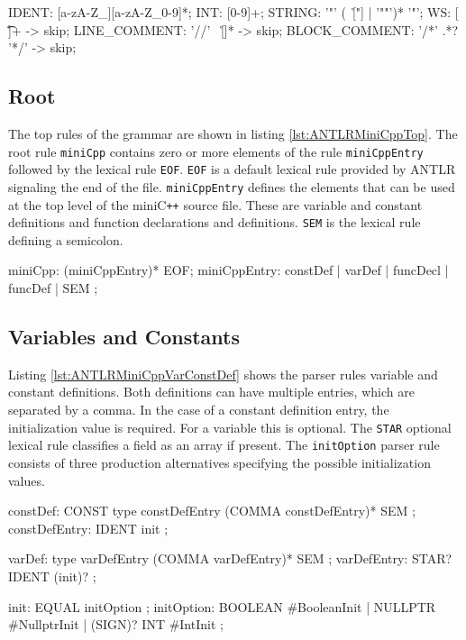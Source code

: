 \begin{AntlrCode}[float,numbers=none,caption=Terminal classes of the MiniC++ ANTLR grammar., label=lst:ANTLRMiniCppTermClass]
IDENT:          [a-zA-Z_][a-zA-Z_0-9]*;
INT:            [0-9]+;
STRING:         '"' (~[\r\n"] | '""')* '"';
WS:             [ \t\n\r]+ -> skip;
LINE_COMMENT:   '//' ~[\r\n]* -> skip;
BLOCK_COMMENT:  '/*' .*? '*/' -> skip;
\end{AntlrCode}


\subsection{Root}

The top rules of the grammar are shown in listing \ref{lst:ANTLRMiniCppTop}. The root rule \texttt{miniCpp} contains zero or more elements of the rule \texttt{miniCppEntry} followed by the lexical rule \texttt{EOF}. \texttt{EOF} is a default lexical rule provided by ANTLR signaling the end of the file. \texttt{miniCppEntry} defines the elements that can be used at the top level of the miniC\verb|++| source file. These are variable and constant definitions and function declarations and definitions. \texttt{SEM} is the lexical rule defining a semicolon. 

\begin{AntlrCode}[float,numbers=none,caption=Top rules of the MiniC++ ANTLR grammar., label=lst:ANTLRMiniCppTop]
miniCpp:     (miniCppEntry)* EOF;
miniCppEntry:     constDef
                | varDef
                | funcDecl
                | funcDef
                | SEM
                ;
\end{AntlrCode}



\subsection{Variables and Constants}

Listing \ref{lst:ANTLRMiniCppVarConstDef} shows the parser rules variable and constant definitions. Both definitions can have multiple entries, which are separated by a comma. In the case of a constant definition entry, the initialization value is required. For a variable this is optional. The \texttt{STAR} optional lexical rule classifies a field as an array if present. The \texttt{initOption} parser rule consists of three production alternatives specifying the possible initialization values. 

\begin{AntlrCode}[float,numbers=none,caption=Variable and constant defintions of the MiniC++ ANTLR grammar., label=lst:ANTLRMiniCppVarConstDef]
constDef:        CONST type constDefEntry (COMMA constDefEntry)* SEM ;
constDefEntry:   IDENT init ;

varDef:          type varDefEntry (COMMA varDefEntry)* SEM ;
varDefEntry:     STAR? IDENT (init)? ;

init:            EQUAL  initOption ;
initOption:      BOOLEAN      #BooleanInit
               | NULLPTR      #NullptrInit
               | (SIGN)? INT  #IntInit
               ;
\end{AntlrCode}

